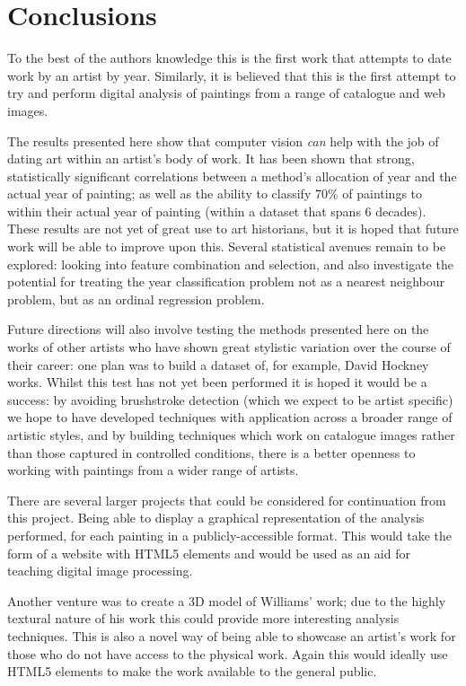 \section{Conclusions}


To the best of the authors knowledge this is the first work that attempts to date work by an artist by 
year. Similarly, it is believed that this is the first attempt to try and perform digital analysis
of paintings from a range of catalogue and web images.

The results presented here show that computer vision \emph{can} help with the job of dating art 
within an artist's body of work. It has been shown that strong, statistically significant 
correlations between a method's allocation of year and the actual year of painting; as well as the
ability to classify 70\% of paintings to within their actual year of painting (within a dataset 
that spans 6 decades). These results are not yet of great use to art historians, but it is hoped 
that future work will be able to improve upon this. Several statistical avenues remain to be 
explored: looking into feature combination and selection, and also investigate the potential for 
treating the year classification problem not as a nearest neighbour problem, but as an ordinal 
regression problem. 

Future directions will also involve testing the methods presented here on the works of other 
artists who have shown great stylistic variation over the course of their career: one plan was to 
build a dataset of, for example, David Hockney works.  Whilst this test has not yet been performed
it is hoped it would be a success: by avoiding brushstroke detection (which we expect to be artist
specific) we hope to have developed techniques with application across a broader range of artistic
styles, and by building techniques which work on catalogue images rather than those captured in 
controlled conditions, there is a better openness to working with paintings from a wider range of 
artists.


There are several larger projects that could be considered for continuation from this project. 
Being able to display a graphical representation of the analysis performed, for each painting in a
publicly-accessible format. This would take the form of a website with HTML5 elements and would be used as an aid for teaching digital 
image processing.

Another venture was to create a 3D model of Williams' work; due to the highly textural nature of
his work this could provide more interesting analysis techniques. This is also a novel way of being
able to showcase an artist's work for those who do not have access to the physical work. Again
this would ideally use HTML5 elements to make the work available to the general public.

